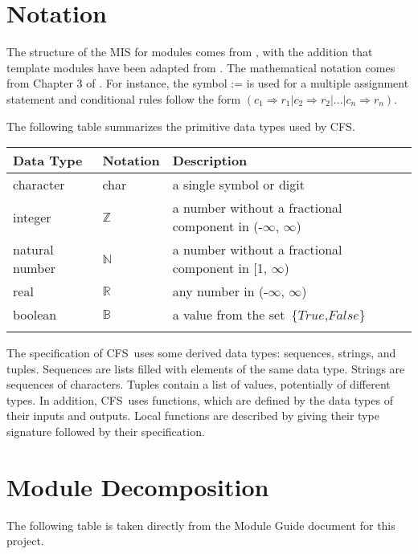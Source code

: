 \documentclass[12pt, titlepage]{article}
\newcommand{\progname}{CFS}
\begin{document}
\section{Notation}

The structure of the MIS for modules comes from \citet{HoffmanAndStrooper1995},
with the addition that template modules have been adapted from
\cite{GhezziEtAl2003}. The mathematical notation comes from Chapter 3 of
\citet{HoffmanAndStrooper1995}.  For instance, the symbol := is used for a
multiple assignment statement and conditional rules follow the form $(c_1
\Longrightarrow r_1 | c_2 \Longrightarrow r_2 | ... | c_n \Longrightarrow r_n 
)$.



The following table summarizes the primitive data types used by \progname. 

\begin{center}
\renewcommand{\arraystretch}{1.2}
\noindent 
\begin{tabular}{l l p{7.5cm}} 
\toprule 
\textbf{Data Type} & \textbf{Notation} & \textbf{Description}\\ 
\midrule
character & char & a single symbol or digit\\
integer & $\mathbb{Z}$ & a number without a fractional component in (-$\infty$, $\infty$) \\
natural number & $\mathbb{N}$ & a number without a fractional component in [1, 
$\infty$) \\
real & $\mathbb{R}$ & any number in (-$\infty$, $\infty$)\\

boolean & $\mathbb{B}$ & a value from the set\ \{$True$,$False$\}\\
\bottomrule
\\
\end{tabular} 
\end{center}

\noindent
The specification of \progname \ uses some derived data types: sequences, strings, and
tuples. Sequences are lists filled with elements of the same data type. Strings
are sequences of characters. Tuples contain a list of values, potentially of
different types. In addition, \progname \ uses functions, which
are defined by the data types of their inputs and outputs. Local functions are
described by giving their type signature followed by their specification.

\section{Module Decomposition}
The following table is taken directly from the Module Guide document for this project.
\end{document}
